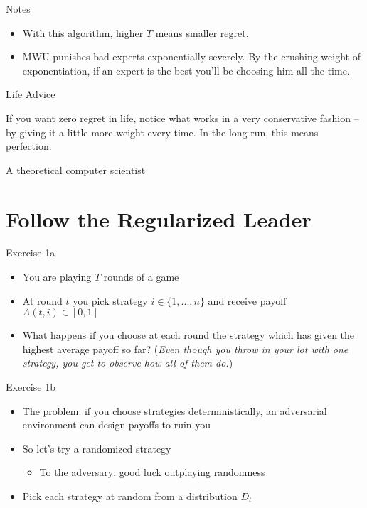 \documentclass[10pt]{beamer}
\begin{document}
\begin{frame}[fragile]{Notes}

\begin{itemize}
\item With this algorithm, higher $T$ means smaller regret.
\item MWU punishes bad experts exponentially severely. By the crushing weight of exponentiation, if an expert is the best you'll be choosing him all the time.
\end{itemize}

\end{frame}

\begin{frame}[fragile]{Life Advice}

\epigraph{If you want zero regret in life, notice what works in a very conservative fashion -- by giving it a little more weight every time. In the long run, this means perfection.}{A theoretical computer scientist}

\end{frame}

\section{Follow the Regularized Leader}

\begin{frame}[fragile]{Exercise 1a}

\begin{itemize}
\item You are playing $T$ rounds of a game
\item At round $t$ you pick strategy $i \in \{1, ..., n\}$ and receive payoff $A(t, i) \in [0, 1]$
\item What happens if you choose at each round the strategy which has given the highest average payoff so far? (\textit{Even though you throw in your lot with one strategy, you get to observe how all of them do.})
\end{itemize}

\end{frame}

\begin{frame}[fragile]{Exercise 1b}

\begin{itemize}
\item The problem: if you choose strategies deterministically, an adversarial environment can design payoffs to ruin you
\item So let's try a randomized strategy
  \begin{itemize}
  \item To the adversary: good luck outplaying randomness
  \end{itemize}
\item Pick each strategy at random from a distribution $D_t$
\end{itemize}

\end{frame}
\end{document}
